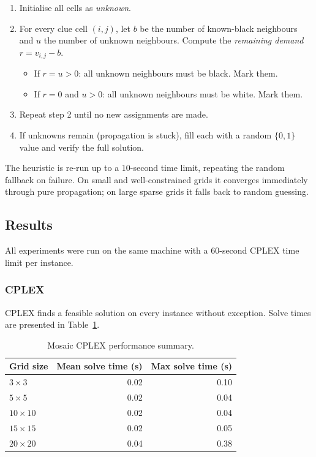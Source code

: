 \begin{enumerate}
  \item Initialise all cells as \emph{unknown}.
  \item For every clue cell $(i,j)$, let $b$ be the number of known-black neighbours and $u$ the number of unknown neighbours. Compute the \emph{remaining demand} $r = v_{i,j} - b$.
  \begin{itemize}
    \item If $r = u > 0$: all unknown neighbours must be black. Mark them.
    \item If $r = 0$ and $u > 0$: all unknown neighbours must be white. Mark them.
  \end{itemize}
  \item Repeat step 2 until no new assignments are made.
  \item If unknowns remain (propagation is stuck), fill each with a random $\{0,1\}$ value and verify the full solution.
\end{enumerate}

The heuristic is re-run up to a 10-second time limit, repeating the random fallback on failure. On small and well-constrained grids it converges immediately through pure propagation; on large sparse grids it falls back to random guessing.

\subsection{Results}

All experiments were run on the same machine with a 60-second CPLEX time limit per instance.

\subsubsection{CPLEX}

CPLEX finds a feasible solution on every instance without exception. Solve times are presented in Table~\ref{tab:mosaic_summary}.

\begin{table}[H]
  \centering
  \caption{Mosaic CPLEX performance summary.}
  \label{tab:mosaic_summary}
  \begin{tabular}{lrr}
    \toprule
    Grid size & Mean solve time (s) & Max solve time (s) \\
    \midrule
    $3 \times 3$   & 0.02 & 0.10 \\
    $5 \times 5$   & 0.02 & 0.04 \\
    $10 \times 10$ & 0.02 & 0.04 \\
    $15 \times 15$ & 0.02 & 0.05 \\
    $20 \times 20$ & 0.04 & 0.38 \\
    \bottomrule
  \end{tabular}
\end{table}

